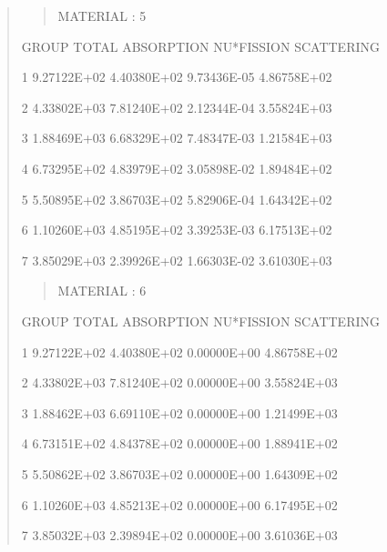 \documentclass[letterpaper,10pt,english]{sphinxmanual}
\begin{document}
\begin{quote}
\begin{quote}
MATERIAL :   5
\end{quote}

\begin{DUlineblock}{0em}
\item[] GROUP           TOTAL        ABSORPTION      NU*FISSION      SCATTERING        \textbar{}
\end{DUlineblock}

\begin{DUlineblock}{0em}
\item[] 1          9.27122E+02     4.40380E+02     9.73436E-05     4.86758E+02      \textbar{}
\item[] 2          4.33802E+03     7.81240E+02     2.12344E-04     3.55824E+03      \textbar{}
\item[] 3          1.88469E+03     6.68329E+02     7.48347E-03     1.21584E+03      \textbar{}
\item[] 4          6.73295E+02     4.83979E+02     3.05898E-02     1.89484E+02      \textbar{}
\item[] 5          5.50895E+02     3.86703E+02     5.82906E-04     1.64342E+02      \textbar{}
\item[] 6          1.10260E+03     4.85195E+02     3.39253E-03     6.17513E+02      \textbar{}
\item[] 7          3.85029E+03     2.39926E+02     1.66303E-02     3.61030E+03      \textbar{}
\end{DUlineblock}
\begin{quote}

MATERIAL :   6
\end{quote}

\begin{DUlineblock}{0em}
\item[] GROUP           TOTAL        ABSORPTION      NU*FISSION      SCATTERING        \textbar{}
\end{DUlineblock}

\begin{DUlineblock}{0em}
\item[] 1          9.27122E+02     4.40380E+02     0.00000E+00     4.86758E+02      \textbar{}
\item[] 2          4.33802E+03     7.81240E+02     0.00000E+00     3.55824E+03      \textbar{}
\item[] 3          1.88462E+03     6.69110E+02     0.00000E+00     1.21499E+03      \textbar{}
\item[] 4          6.73151E+02     4.84378E+02     0.00000E+00     1.88941E+02      \textbar{}
\item[] 5          5.50862E+02     3.86703E+02     0.00000E+00     1.64309E+02      \textbar{}
\item[] 6          1.10260E+03     4.85213E+02     0.00000E+00     6.17495E+02      \textbar{}
\item[] 7          3.85032E+03     2.39894E+02     0.00000E+00     3.61036E+03      \textbar{}
\end{DUlineblock}
\begin{quote}


\end{quote}
\end{quote}
\end{document}
